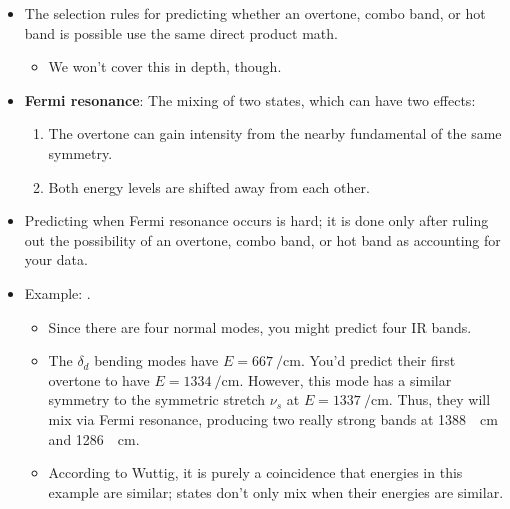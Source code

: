\documentclass[../notes.tex]{subfiles}
\begin{document}
\begin{itemize}
\begin{itemize}
    \end{itemize}
    \item The selection rules for predicting whether an overtone, combo band, or hot band is possible use the same direct product math.
    \begin{itemize}
        \item We won't cover this in depth, though.
    \end{itemize}
    \item \textbf{Fermi resonance}: The mixing of two states, which can have two effects:
    \begin{enumerate}
        \item The overtone can gain intensity from the nearby fundamental of the same symmetry.
        \item Both energy levels are shifted away from each other.
    \end{enumerate}
    \item Predicting when Fermi resonance occurs is hard; it is done only after ruling out the possibility of an overtone, combo band, or hot band as accounting for your data.
    \item Example: .
    \begin{itemize}
        \item Since there are four normal modes, you might predict four IR bands.
        \item The $\delta_d$ bending modes have $E=\SI{667}{\per\centi\meter}$. You'd predict their first overtone to have $E=\SI{1334}{\per\centi\meter}$. However, this mode has a similar symmetry to the symmetric stretch $\nu_s$ at $E=\SI{1337}{\per\centi\meter}$. Thus, they will mix via Fermi resonance, producing two really strong bands at \SI{1388}{\per\centi\meter} and \SI{1286}{\per\centi\meter}.
        \item According to Wuttig, it is purely a coincidence that energies in this example are similar; states don't only mix when their energies are similar.
    \end{itemize}
\end{itemize}
\end{document}
